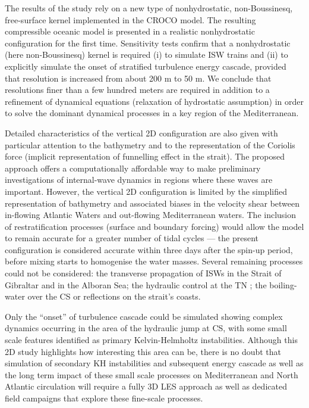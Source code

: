 The results of the study rely on a new type of nonhydrostatic, non-Boussinesq, free-surface kernel \citep{Auclair2018} implemented in the CROCO model. The resulting compressible oceanic model is presented in a realistic nonhydrostatic configuration for the first time. Sensitivity tests confirm that a nonhydrostatic (here non-Boussinesq) kernel is required (i) to simulate ISW trains and (ii) to explicitly simulate the onset of stratified turbulence energy cascade, provided that resolution is increased from about 200 m to 50 m. We conclude that resolutions finer than a few hundred meters are required in addition to a refinement of dynamical equations (relaxation of hydrostatic assumption) in order to solve the dominant dynamical processes in a key region of the Mediterranean.

Detailed characteristics of the vertical 2D configuration are also given with particular attention to the bathymetry and to the representation of the Coriolis force (implicit representation of funnelling effect in the strait). The proposed approach offers a computationally affordable way to make preliminary investigations of internal-wave dynamics in regions where these waves are important. However, the vertical 2D configuration is limited by the simplified representation of bathymetry and associated biases in the velocity shear between in-flowing Atlantic Waters and out-flowing Mediterranean waters. The inclusion of restratification processes (surface and boundary forcing) would allow the model to remain accurate for a greater number of tidal cycles --- the present configuration is considered accurate within three days after the spin-up period, before mixing starts to homogenise the water masses. Several remaining processes could not be considered: the transverse propagation of ISWs in the Strait of Gibraltar \citep{SG2011, vlasenko_2009} and in the Alboran Sea; the hydraulic control at the TN \citep{FA1988, Sannino2009b}; the boiling-water over the CS \citep{Bruno2002} or reflections on the strait's coasts. 

Only the ``onset'' of turbulence cascade could be simulated showing complex dynamics occurring in the area of the hydraulic jump at CS, with some small scale features identified as primary Kelvin-Helmholtz instabilities. Although this 2D study highlights how interesting this area can be, there is no doubt that simulation of secondary KH instabilities and subsequent energy cascade as well as the long term impact of these small scale processes on Mediterranean and North Atlantic circulation will require a fully 3D LES approach as well as dedicated field campaigns that explore these fine-scale processes.


